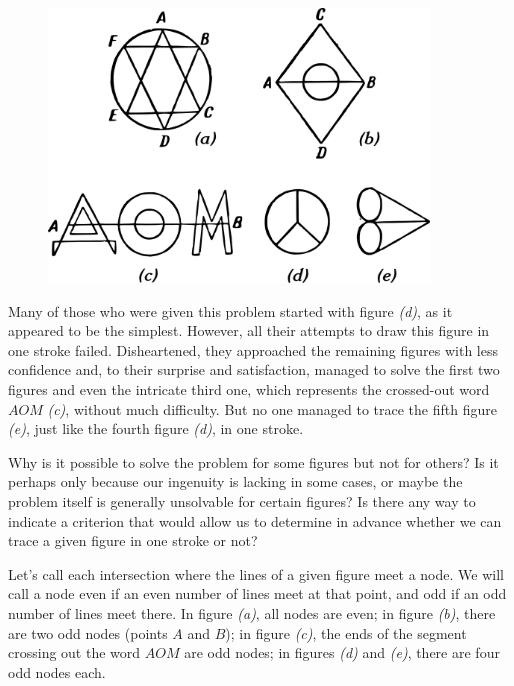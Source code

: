 \begin{figure}[h!]
\centering
\includegraphics[width=0.9\textwidth]{figures/ch-10/fig-155.pdf}
\end{figure}


Many of those who were given this problem started with figure \emph{(d)}, as it appeared to be the simplest. However, all their attempts to draw this figure in one stroke failed. Disheartened, they approached the remaining figures with less confidence and, to their surprise and satisfaction, managed to solve the first two figures and even the intricate third one, which represents the crossed-out word $AOM$ \emph{(c)}, without much difficulty. But no one managed to trace the fifth figure \emph{(e)}, just like the fourth figure \emph{(d)}, in one stroke.

Why is it possible to solve the problem for some figures but not for others? Is it perhaps only because our ingenuity is lacking in some cases, or maybe the problem itself is generally unsolvable for certain figures? Is there any way to indicate a criterion that would allow us to determine in advance whether we can trace a given figure in one stroke or not?

\ans Let's call each intersection where the lines of a given figure meet a node. We will call a node even if an even number of lines meet at that point, and odd if an odd number of lines meet there. In figure \emph{(a)}, all nodes are even; in figure \emph{(b)}, there are two odd nodes (points $A$ and $B$); in figure \emph{(c)}, the ends of the segment crossing out the word $AOM$ are odd nodes; in figures \emph{(d)} and \emph{(e)}, there are four odd nodes each.

